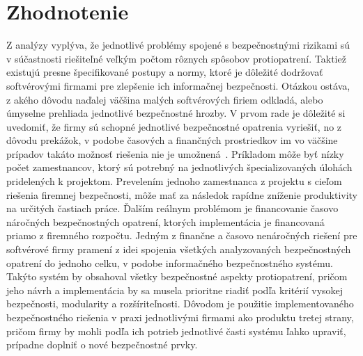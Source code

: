\section{Zhodnotenie}\label{sec:podsekcia-3}

Z analýzy vyplýva, že jednotlivé problémy spojené s bezpečnostnými rizikami sú v súčastnosti riešiteľné veľkým počtom
rôznych spôsobov protiopatrení.
Taktiež existujú presne špecifikované postupy a normy, ktoré je dôležité dodržovať softvérovými firmami pre zlepšenie
ich informačnej bezpečnosti.
Otázkou ostáva, z akého dôvodu naďalej väčšina malých softvérových firiem odkladá, alebo úmyselne prehliada jednotlivé bezpečnostné hrozby.
V prvom rade je dôležité si uvedomiť, že firmy sú schopné jednotlivé bezpečnostné opatrenia vyriešiť, no z dôvodu
prekážok, v podobe časových a finančných prostriedkov im vo väčšine prípadov takáto možnosť riešenia nie je umožnená~\cite{CompanySecurity}.
Príkladom môže byť nízky počet zamestnancov, ktorý sú potrebný na jednotlivých špecializovaných úlohách  pridelených k projektom.
Prevelením jednoho zamestnanca z projektu s cieľom riešenia firemnej bezpečnosti, môže mať za následok rapídne zníženie
produktivity na určitých častiach práce.
Ďalším reálnym problémom je financovanie časovo náročných bezpečnostných opatrení, ktorých implementácia je financovaná priamo z firemného rozpočtu.
Jedným z finančne a časovo nenáročných riešení pre softvérové firmy pramení z idei spojenia všetkých analyzovaných
bezpečnostných opatrení do jednoho celku, v podobe informačného bezpečnostného systému.
Takýto systém by obsahoval všetky bezpečnostné aspekty protiopatrení, pričom jeho návrh a implementácia by sa musela prioritne riadiť podľa kritérií vysokej
bezpečnosti, modularity a rozšíriteľnosti.
Dôvodom je použitie implementovaného bezpečnostného riešenia v praxi jednotlivými firmami ako produktu tretej strany,
pričom firmy by mohli podľa ich potrieb jednotlivé časti systému ľahko upraviť, prípadne doplniť o nové bezpečnostné prvky.

